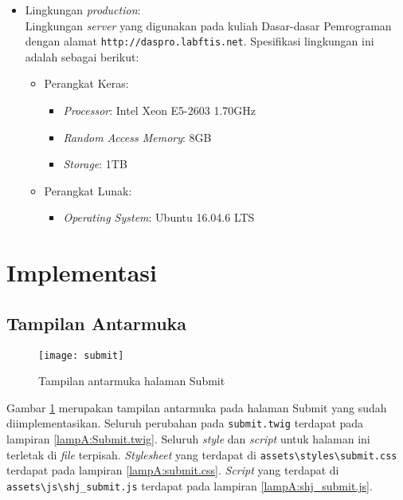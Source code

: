 \begin{itemize}
    \item Lingkungan \textit{production}: \\ Lingkungan \textit{server} yang digunakan pada kuliah Dasar-dasar Pemrograman dengan alamat \verb|http://daspro.labftis.net|. Spesifikasi lingkungan ini adalah sebagai berikut:
    \begin{itemize}
    \item Perangkat Keras:
        \begin{itemize}
            \item \textit{Processor}: Intel Xeon E5-2603 1.70GHz
            \item \textit{Random Access Memory}: 8GB
            \item \textit{Storage}: 1TB
        \end{itemize}
            \item Perangkat Lunak:
        \begin{itemize}
            \item \textit{Operating System}: Ubuntu 16.04.6 LTS
        \end{itemize}
    \end{itemize}
\end{itemize}

\section{Implementasi}
\label{sec:5:implementasi}

\subsection{Tampilan Antarmuka}
\label{subsec:5:antarmuka}

\begin{figure}[H]
	\centering  
	\texttt{[image: submit]}  
	\caption{Tampilan antarmuka halaman Submit} 
	\label{fig:5:antarmuka} 
\end{figure}

Gambar \ref{fig:5:antarmuka} merupakan tampilan antarmuka pada halaman Submit yang sudah diimplementasikan. Seluruh perubahan pada \verb|submit.twig| terdapat pada lampiran \ref{lampA:Submit.twig}. Seluruh \textit{style} dan \textit{script} untuk halaman ini terletak di \textit{file} terpisah. \textit{Stylesheet} yang terdapat di \verb|assets\styles\submit.css| terdapat pada lampiran \ref{lampA:submit.css}. \textit{Script} yang terdapat di \verb|assets\js\shj_submit.js| terdapat pada lampiran \ref{lampA:shj_submit.js}.

